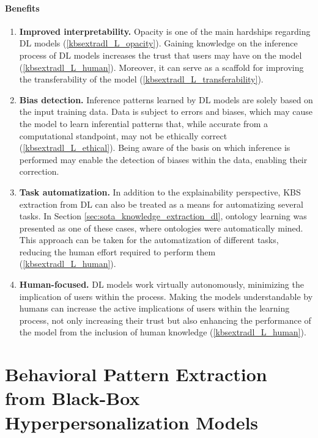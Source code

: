 \paragraph{Benefits}
\begin{enumerate} [start=1,label={\bfseries B\arabic*.}]
    \item \textbf{Improved interpretability.}\label{kbsextradl_B_interpretability} Opacity is one of the main hardships regarding DL models (\ref{kbsextradl_L_opacity}). Gaining knowledge on the inference process of DL models increases the trust that users may have on the model (\ref{kbsextradl_L_human}). Moreover, it can serve as a scaffold for improving the transferability of the model (\ref{kbsextradl_L_transferability}).
    
    \item \textbf{Bias detection.}\label{kbsextradl_B_bias} Inference patterns learned by DL models are solely based on the input training data. Data is subject to errors and biases, which may cause the model to learn inferential patterns that, while accurate from a computational standpoint, may not be ethically correct (\ref{kbsextradl_L_ethical}). Being aware of the basis on which inference is performed may enable the detection of biases within the data, enabling their correction.
    
    \item \textbf{Task automatization.}\label{kbsextradl_B_automatization} In addition to the explainability perspective, KBS extraction from DL can also be treated as a means for automatizing several tasks. In Section \ref{sec:sota_knowledge_extraction_dl}, ontology learning was presented as one of these cases, where ontologies were automatically mined. This approach can be taken for the automatization of different tasks, reducing the human effort required to perform them (\ref{kbsextradl_L_human}).
    
    \item \textbf{Human-focused.}\label{kbsextradl_B_human} DL models work virtually autonomously, minimizing the implication of users within the process. Making the models understandable by humans can increase the active implications of users within the learning process, not only increasing their trust but also enhancing the performance of the model from the inclusion of human knowledge (\ref{kbsextradl_L_human}). 
\end{enumerate}
\section{Behavioral Pattern Extraction from Black-Box Hyperpersonalization Models}\label{6_sec:mas_bbhos_general}

